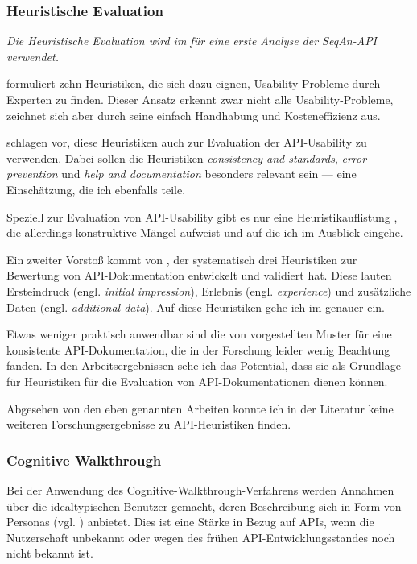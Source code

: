 \subsubsection{Heuristische Evaluation}
\begin{important}
\textit{Die Heuristische Evaluation wird im  für eine erste Analyse der SeqAn-API verwendet.}

\cite{Nielsen:1990bw} formuliert zehn Heuristiken, die sich dazu eignen, Usability-Probleme durch Experten zu finden. Dieser Ansatz erkennt zwar nicht alle Usability-Probleme, zeichnet sich aber durch seine einfach Handhabung und Kosteneffizienz aus.

\cite{Beaton:2008ix} schlagen vor, diese Heuristiken auch zur Evaluation der API-Usability zu verwenden. Dabei sollen die Heuristiken \textit{consistency and standards}, \textit{error prevention} und \textit{help and documentation} besonders relevant sein --- eine Einschätzung, die ich ebenfalls teile.

Speziell zur Evaluation von API-Usability gibt es nur eine Heuristikauflistung \citep{Grill:2012jm}, die allerdings konstruktive Mängel aufweist und auf die ich im Ausblick eingehe.

Ein zweiter Vorstoß kommt von \cite{Watson:2012es}, der systematisch drei Heuristiken zur Bewertung von API-Dokumentation entwickelt und validiert hat. Diese lauten Ersteindruck (engl. \textit{initial impression}), Erlebnis (engl. \textit{experience}) und zusätzliche Daten (engl. \textit{additional data}). Auf diese Heuristiken gehe ich im  genauer ein.

Etwas weniger praktisch anwendbar sind die von \cite{Correia:2010bx} vorgestellten Muster für eine konsistente API-Dokumentation, die in der Forschung leider wenig Beachtung fanden. In den Arbeitsergebnissen sehe ich das Potential, dass sie als Grundlage für Heuristiken für die Evaluation von API-Dokumentationen dienen können.

Abgesehen von den eben genannten Arbeiten konnte ich in der Literatur keine weiteren Forschungsergebnisse zu API-Heuristiken finden.
\end{important}


\subsubsection{Cognitive Walkthrough}

Bei der Anwendung des Cognitive-Walkthrough-Verfahrens \citep{Wharton:1994to} werden Annahmen über die idealtypischen Benutzer gemacht, deren Beschreibung sich in Form von Personas (vgl. ) anbietet. Dies ist eine Stärke in Bezug auf APIs, wenn die Nutzerschaft unbekannt oder wegen des frühen API-Entwicklungsstandes noch nicht bekannt ist.

